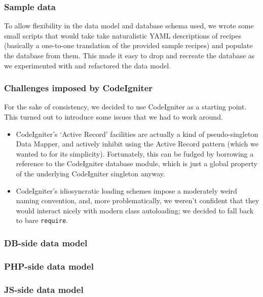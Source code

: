 \subsubsection{Sample data}

To allow flexibility in the data model and database schema used, we
wrote some small scripts that would take take naturalistic YAML
descriptions of recipes (basically a one-to-one translation of the
provided sample recipes) and populate the database from them. This
made it easy to drop and recreate the database as we experimented with
and refactored the data model.

\subsubsection{Challenges imposed by CodeIgniter}

For the sake of consistency, we decided to use CodeIgniter as a
starting point. This turned out to introduce some issues that we had
to work around.

\begin{itemize}
\item CodeIgniter's `Active Record' facilities are actually a kind of
  pseudo-singleton Data Mapper, and actively inhibit using the Active
  Record pattern (which we wanted to for its simplicity). Fortunately,
  this can be fudged by borrowing a reference to the CodeIgniter
  database module, which is just a global property of the underlying
  CodeIgniter singleton anyway.
\item CodeIgniter's idiosyncratic loading schemes impose a moderately
  weird naming convention, and, more problematically, we weren't
  confident that they would interact nicely with modern class
  autoloading; we decided to fall back to bare \texttt{require}.
\end{itemize}

\subsubsection{DB-side data model}

\subsubsection{PHP-side data model}

\subsubsection{JS-side data model}

